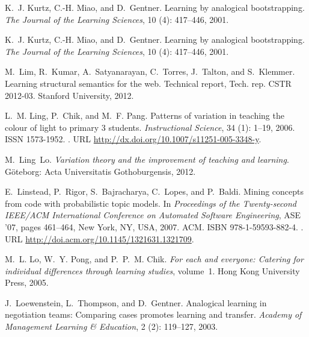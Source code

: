 \documentclass[12pt,twoside]{mitthesis}
\begin{document}
{{{{{{{{{{\begin{thebibliography}{135}
K.~J. Kurtz, C.-H. Miao, and D.~Gentner.
\newblock Learning by analogical bootstrapping.
\newblock \emph{The Journal of the Learning Sciences}, 10
  (4): 417--446, 2001{}.

K.~J. Kurtz, C.-H. Miao, and D.~Gentner.
\newblock Learning by analogical bootstrapping.
\newblock \emph{The Journal of the Learning Sciences}, 10
  (4): 417--446, 2001{}.

M.~Lim, R.~Kumar, A.~Satyanarayan, C.~Torres, J.~Talton, and S.~Klemmer.
\newblock Learning structural semantics for the web.
\newblock Technical report, Tech. rep. CSTR 2012-03. Stanford University, 2012.

L.~M. Ling, P.~Chik, and M.~F. Pang.
\newblock Patterns of variation in teaching the colour of light to primary 3
  students.
\newblock \emph{Instructional Science}, 34 (1): 1--19, 2006.
\newblock ISSN 1573-1952.
\newblock {}.
\newblock URL \url{http://dx.doi.org/10.1007/s11251-005-3348-y}.

M.~Ling~Lo.
\newblock \emph{Variation theory and the improvement of teaching and learning}.
\newblock G{\"o}teborg: Acta Universitatis Gothoburgensis, 2012.

E.~Linstead, P.~Rigor, S.~Bajracharya, C.~Lopes, and P.~Baldi.
\newblock Mining concepts from code with probabilistic topic models.
\newblock In \emph{Proceedings of the Twenty-second IEEE/ACM International
  Conference on Automated Software Engineering}, ASE '07, pages 461--464, New
  York, NY, USA, 2007. ACM.
\newblock ISBN 978-1-59593-882-4.
\newblock {}.
\newblock URL \url{http://doi.acm.org/10.1145/1321631.1321709}.

M.~L. Lo, W.~Y. Pong, and P.~P.~M. Chik.
\newblock \emph{For each and everyone: Catering for individual differences
  through learning studies}, volume~1.
\newblock Hong Kong University Press, 2005.

J.~Loewenstein, L.~Thompson, and D.~Gentner.
\newblock Analogical learning in negotiation teams: Comparing cases promotes
  learning and transfer.
\newblock \emph{Academy of Management Learning \& Education}, 2
  (2): 119--127, 2003{}.


\end{thebibliography}}}}}}}}}}}
\end{document}
